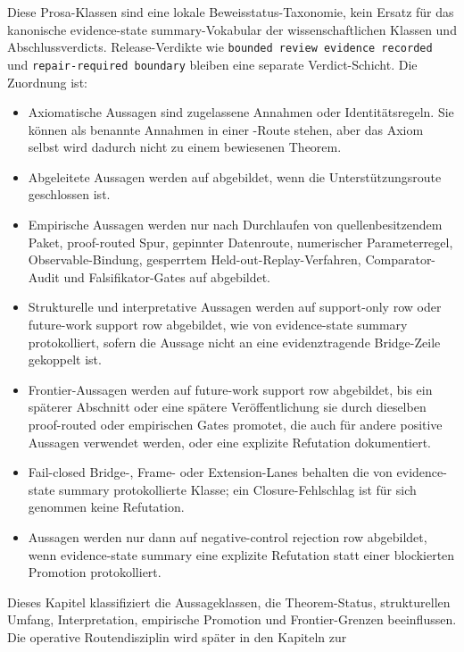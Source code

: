 Diese Prosa-Klassen sind eine lokale Beweisstatus-Taxonomie, kein Ersatz für
das kanonische evidence-state summary-Vokabular der wissenschaftlichen Klassen und
Abschlussverdicts. Release-Verdikte wie \texttt{bounded review evidence recorded} und
\texttt{repair-required boundary} bleiben eine separate Verdict-Schicht. Die Zuordnung ist:
\begin{itemize}
\item Axiomatische Aussagen sind zugelassene Annahmen oder Identitätsregeln.
      Sie können als benannte Annahmen in einer -Route
      stehen, aber das Axiom selbst wird dadurch nicht zu einem bewiesenen
      Theorem.
\item Abgeleitete Aussagen werden auf  abgebildet,
      wenn die Unterstützungsroute geschlossen ist.
\item Empirische Aussagen werden nur nach Durchlaufen von quellenbesitzendem
      Paket, proof-routed Spur, gepinnter Datenroute, numerischer
      Parameterregel, Observable-Bindung, gesperrtem Held-out-Replay-Verfahren,
      Comparator-Audit und Falsifikator-Gates auf 
      abgebildet.
\item Strukturelle und interpretative Aussagen werden auf support-only row
      oder future-work support row abgebildet, wie von evidence-state summary protokolliert, sofern
      die Aussage nicht an eine evidenztragende Bridge-Zeile gekoppelt ist.
\item Frontier-Aussagen werden auf future-work support row abgebildet, bis ein
      späterer Abschnitt oder eine spätere Veröffentlichung sie durch dieselben
      proof-routed oder empirischen Gates promotet, die auch für andere
      positive Aussagen verwendet werden, oder eine explizite Refutation
      dokumentiert.
\item Fail-closed Bridge-, Frame- oder Extension-Lanes behalten die von evidence-state summary
      protokollierte Klasse; ein Closure-Fehlschlag ist für sich genommen keine
      Refutation.
\item Aussagen werden nur dann auf negative-control rejection row abgebildet, wenn evidence-state summary eine
      explizite Refutation statt einer blockierten Promotion protokolliert.
\end{itemize}
Dieses Kapitel klassifiziert die Aussageklassen, die Theorem-Status,
strukturellen Umfang, Interpretation, empirische Promotion und Frontier-Grenzen
beeinflussen. Die operative Routendisziplin wird später in den Kapiteln zur
